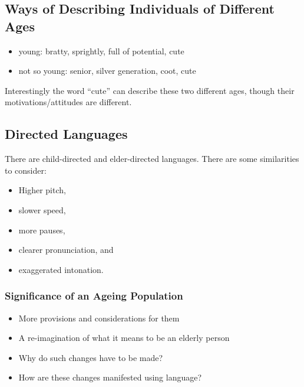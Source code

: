 \documentclass[../main.tex]{subfiles}
\begin{document}
\subsection{Ways of Describing Individuals of Different Ages}
\begin{itemize}
	\item young: bratty, sprightly, full of potential, cute
	\item not so young: senior, silver generation, coot, cute
\end{itemize}

Interestingly the word ``cute'' can describe these two different ages, though their motivations/attitudes are different.

\subsection{Directed Languages}
There are child-directed and elder-directed languages. There are some similarities to consider:
\begin{itemize}
	\item Higher pitch,
	\item slower speed,
	\item more pauses,
	\item clearer pronunciation, and
	\item exaggerated intonation.
\end{itemize}

\subsubsection{Significance of an Ageing Population}
\begin{itemize}
	\item More provisions and considerations for them
	\item A re-imagination of what it means to be an elderly person
	\item Why do such changes have to be made?
	\item How are these changes manifested using language?
\end{itemize}
\end{document}
